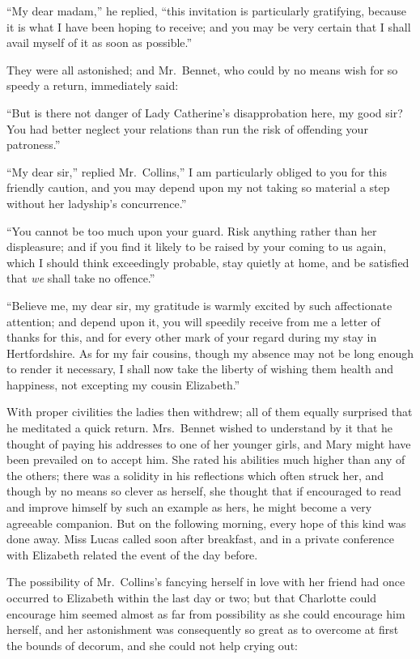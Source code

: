 \documentclass[12pt,english,oneside]{book}
\begin{document}
{}``My dear madam,'' he replied, {}``this invitation is particularly
gratifying, because it is what I have been hoping to receive; and
you may be very certain that I shall avail myself of it as soon as
possible.''

They were all astonished; and Mr.\ Bennet, who could by no means
wish for so speedy a return, immediately said:

{}``But is there not danger of Lady Catherine's disapprobation here,
my good sir? You had better neglect your relations than run the risk
of offending your patroness.''

{}``My dear sir,'' replied Mr.\ Collins,'' I am particularly obliged
to you for this friendly caution, and you may depend upon my not taking
so material a step without her ladyship's concurrence.''

{}``You cannot be too much upon your guard. Risk anything rather
than her displeasure; and if you find it likely to be raised by your
coming to us again, which I should think exceedingly probable, stay
quietly at home, and be satisfied that \textit{we} shall take no offence.''

{}``Believe me, my dear sir, my gratitude is warmly excited by such
affectionate attention; and depend upon it, you will speedily receive
from me a letter of thanks for this, and for every other mark of your
regard during my stay in Hertfordshire. As for my fair cousins, though
my absence may not be long enough to render it necessary, I shall
now take the liberty of wishing them health and happiness, not excepting
my cousin Elizabeth.''

With proper civilities the ladies then withdrew; all of them equally
surprised that he meditated a quick return. Mrs.\ Bennet wished to
understand by it that he thought of paying his addresses to one of
her younger girls, and Mary might have been prevailed on to accept
him. She rated his abilities much higher than any of the others; there
was a solidity in his reflections which often struck her, and though
by no means so clever as herself, she thought that if encouraged to
read and improve himself by such an example as hers, he might become
a very agreeable companion. But on the following morning, every hope
of this kind was done away. Miss Lucas called soon after breakfast,
and in a private conference with Elizabeth related the event of the
day before.

The possibility of Mr.\ Collins's fancying herself in love with her
friend had once occurred to Elizabeth within the last day or two;
but that Charlotte could encourage him seemed almost as far from possibility
as she could encourage him herself, and her astonishment was consequently
so great as to overcome at first the bounds of decorum, and she could
not help crying out:
\end{document}

